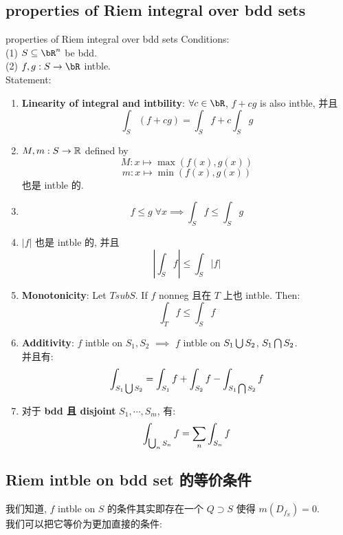 \subsection{properties of Riem integral over bdd sets}
\begin{theorem}{properties of Riem integral over bdd sets}
    Conditions:\\
    (1) $S \sub \bR^n$ be bdd.\\
    (2) $f,g: S\rar \bR$ intble.\\
    Statement:
    \begin{enumerate}
        \item \textbf{Linearity of integral and intbility}: 
        $\forall c \in \bR$, $f + cg$ is also intble, 并且 
        $$ \int_S (f + cg) = \int_S f + c \int_S g$$
        \item 
        $M,m: S \rightarrow \mathbb{R} $ defined by 
        $$
        M: x \mapsto \max{(f(x), g(x))}
        $$
        $$
        m: x \mapsto \min{(f(x), g(x))}
        $$
        也是 intble 的.

        \item 
        $$f \leq g \; \forall x \implies \int_S f \leq \int_S g$$

        \item 
        $|f|$ 也是 intble 的, 并且 
        $$
        |\int_S f | \leq \int_S |f|
        $$

        \item \textbf{Monotonicity}: Let $T sub S$. If $f$ nonneg 且在 $T$ 上也 intble. Then:
        $$
        \int_T f \leq \int_S f
        $$

        \item \textbf{Additivity}: 
        $f$ intble on $S_1, S_2$ $\implies$ $f$ intble on $S_1 \bigcup S_2$, $S_1 \bigcap S_2$.\\
        并且有:
        $$
        \int_{S_1 \bigcup S_2} = \int_{S_1} f + \int_{S_2} f - \int_{S_1 \bigcap S_2} f
        $$

        \item 对于 \textbf{bdd 且 disjoint} $S_1, \cdots, S_m$, 有:
        $$
        \int_{\bigcup_n S_n} f = \sum_n \int_{S_n} f
        $$
    \end{enumerate}
    
\end{theorem}


\subsection{Riem intble on bdd set 的等价条件}
\begin{remark}
    我们知道, $f$ intble on $S$ 的条件其实即存在一个 $Q \supset S$ 使得 $m(D_{f_S}) = 0$.\\
    我们可以把它等价为更加直接的条件:
\end{remark}

